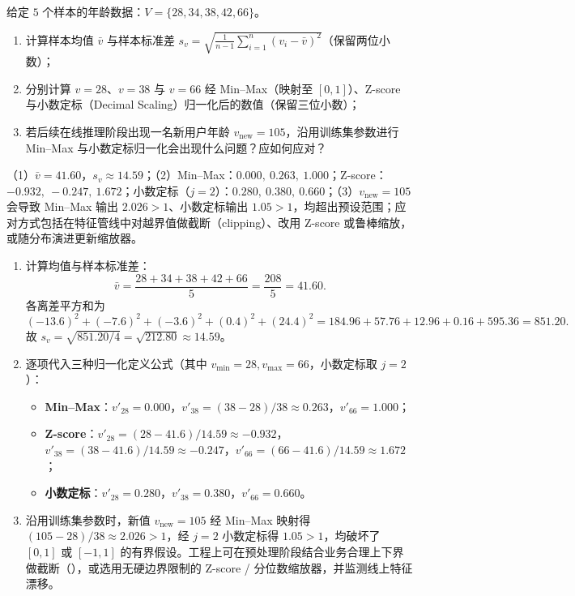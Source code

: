 \begin{exercise}[title={三种数据归一化手算与边界分析},level=standard,points=15,tags={归一化,Min-Max,Z-score,小数定标}]
给定 $5$ 个样本的年龄数据：$V = \{28, 34, 38, 42, 66\}$。
\begin{enumerate}
  \item 计算样本均值 $\bar{v}$ 与样本标准差 $s_v = \sqrt{\frac{1}{n-1}\sum_{i=1}^{n}(v_i-\bar{v})^2}$（保留两位小数）；
  \item 分别计算 $v=28$、$v=38$ 与 $v=66$ 经 Min–Max（映射至 $[0,1]$）、Z-score 与小数定标（Decimal Scaling）归一化后的数值（保留三位小数）；
  \item 若后续在线推理阶段出现一名新用户年龄 $v_{\text{new}} = 105$，沿用训练集参数进行 Min–Max 与小数定标归一化会出现什么问题？应如何应对？
\end{enumerate}
\begin{answer}
（1）$\bar{v} = 41.60$，$s_v \approx 14.59$；（2）Min–Max：$0.000,\ 0.263,\ 1.000$；Z-score：$-0.932,\ -0.247,\ 1.672$；小数定标（$j=2$）：$0.280,\ 0.380,\ 0.660$；（3）$v_{\text{new}}=105$ 会导致 Min–Max 输出 $2.026 > 1$、小数定标输出 $1.05 > 1$，均超出预设范围；应对方式包括在特征管线中对越界值做截断（clipping）、改用 Z-score 或鲁棒缩放，或随分布演进更新缩放器。
\end{answer}
\begin{solution}
\begin{enumerate}
  \item 计算均值与样本标准差：
  \[
    \bar{v} = \frac{28 + 34 + 38 + 42 + 66}{5} = \frac{208}{5} = 41.60.
  \]
  各离差平方和为
  \[
    (-13.6)^2 + (-7.6)^2 + (-3.6)^2 + (0.4)^2 + (24.4)^2
    = 184.96 + 57.76 + 12.96 + 0.16 + 595.36 = 851.20.
  \]
  故 $s_v = \sqrt{851.20 / 4} = \sqrt{212.80} \approx 14.59$。
  \item 逐项代入三种归一化定义公式（其中 $v_{\min}=28, v_{\max}=66$，小数定标取 $j=2$）：
  \begin{itemize}
    \item \textbf{Min–Max}：$v'_{28} = 0.000$，$v'_{38} = (38-28)/38 \approx 0.263$，$v'_{66} = 1.000$；
    \item \textbf{Z-score}：$v'_{28} = (28-41.6)/14.59 \approx -0.932$，$v'_{38} = (38-41.6)/14.59 \approx -0.247$，$v'_{66} = (66-41.6)/14.59 \approx 1.672$；
    \item \textbf{小数定标}：$v'_{28} = 0.280$，$v'_{38} = 0.380$，$v'_{66} = 0.660$。
  \end{itemize}
  \item 沿用训练集参数时，新值 $v_{\text{new}}=105$ 经 Min–Max 映射得 $(105-28)/38 \approx 2.026 > 1$，经 $j=2$ 小数定标得 $1.05 > 1$，均破坏了 $[0,1]$ 或 $[-1,1]$ 的有界假设。工程上可在预处理阶段结合业务合理上下界做截断（），或选用无硬边界限制的 Z-score / 分位数缩放器，并监测线上特征漂移。
\end{enumerate}
\end{solution}
\end{exercise}

